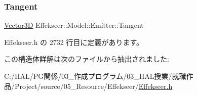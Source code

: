 \subsubsection{\texorpdfstring{Tangent}{Tangent}}
{\footnotesize\ttfamily \mbox{\hyperlink{struct_effekseer_1_1_vector3_d}{Vector3D}} Effekseer\+::\+Model\+::\+Emitter\+::\+Tangent}



 Effekseer.\+h の 2732 行目に定義があります。



この構造体詳解は次のファイルから抽出されました\+:\begin{DoxyCompactItemize}
\item 
C\+:/\+H\+A\+L/\+P\+G関係/03\+\_\+作成プログラム/03\+\_\+\+H\+A\+L授業/就職作品/\+Project/source/05\+\_\+\+Resource/\+Effekseer/\mbox{\hyperlink{_effekseer_8h}{Effekseer.\+h}}\end{DoxyCompactItemize}
